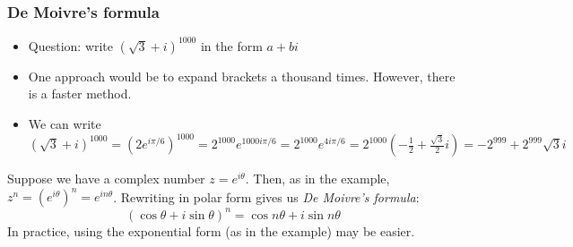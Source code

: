 \begin{frame}
\frametitle{De Moivre's formula}
\begin{itemize}

\item Question: write $(\sqrt{3}+i)^{1000}$ in the form $a+bi$
\pause\item One approach would be to expand brackets a thousand times. However, there is a faster method.
\pause\item We can write $(\sqrt{3}+i)^{1000}=(2e^{i\pi/6})^{1000}=2^{1000}e^{1000i\pi/6}=2^{1000}e^{4i\pi/6}=2^{1000}\left(-\frac{1}{2}+\frac{\sqrt{3}}{2}i\right)=\boxed{-2^{999} +2^{999}\sqrt{3}i} $
\end{itemize}

\begin{tcolorbox}[colback=yellow!50,colframe=violet!85!black,title=De Moivre's formula]
    Suppose we have a complex number $z=e^{i\theta}$. Then, as in the example, $z^n=(e^{i\theta})^n=e^{in\theta}$. Rewriting in polar form gives us \textit{De Moivre's formula}: \[(\cos\theta+i\sin\theta)^n=\cos n\theta + i\sin n\theta\] In practice, using the exponential form (as in the example) may be easier.
    
\end{tcolorbox}
\end{frame}